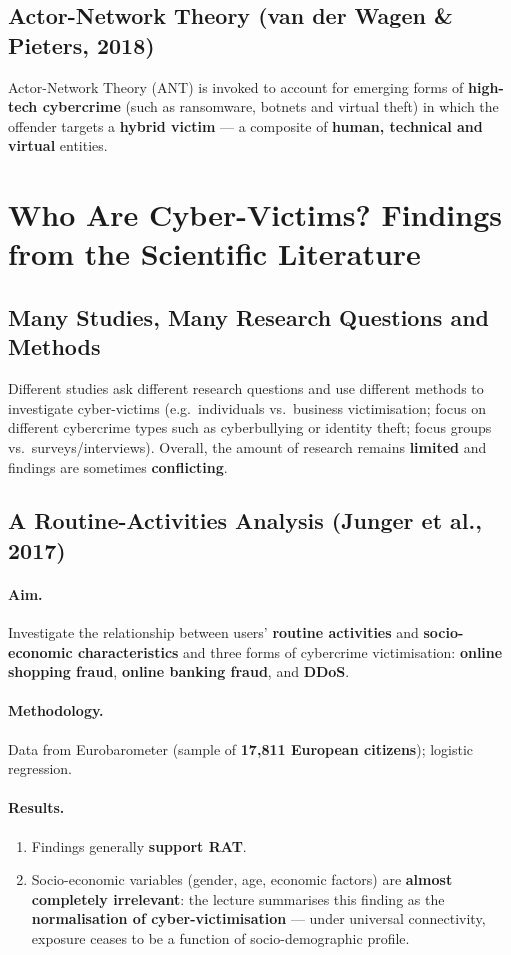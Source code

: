 \documentclass[11pt,a4paper,openany]{report}
\theoremstyle{definition}
\theoremstyle{plain}
\theoremstyle{remark}
\begin{document}
\subsection{Actor-Network Theory (van der Wagen \& Pieters, 2018)}

Actor-Network Theory (ANT) is invoked to account for emerging forms of \textbf{high-tech cybercrime} (such as ransomware, botnets and virtual theft) in which the offender targets a \textbf{hybrid victim} --- a composite of \textbf{human, technical and virtual} entities.

\section{Who Are Cyber-Victims? Findings from the Scientific Literature}

\subsection{Many Studies, Many Research Questions and Methods}

Different studies ask different research questions and use different methods to investigate cyber-victims (e.g.\ individuals vs.\ business victimisation; focus on different cybercrime types such as cyberbullying or identity theft; focus groups vs.\ surveys/interviews). Overall, the amount of research remains \textbf{limited} and findings are sometimes \textbf{conflicting}.

\subsection{A Routine-Activities Analysis (Junger et al., 2017)}

\paragraph{Aim.} Investigate the relationship between users' \textbf{routine activities} and \textbf{socio-economic characteristics} and three forms of cybercrime victimisation: \textbf{online shopping fraud}, \textbf{online banking fraud}, and \textbf{DDoS}.

\paragraph{Methodology.} Data from Eurobarometer (sample of \textbf{17{,}811 European citizens}); logistic regression.

\paragraph{Results.}
\begin{enumerate}
    \item Findings generally \textbf{support RAT}.
    \item Socio-economic variables (gender, age, economic factors) are \textbf{almost completely irrelevant}: the lecture summarises this finding as the \textbf{normalisation of cyber-victimisation} --- under universal connectivity, exposure ceases to be a function of socio-demographic profile.
\end{enumerate}
\end{document}
